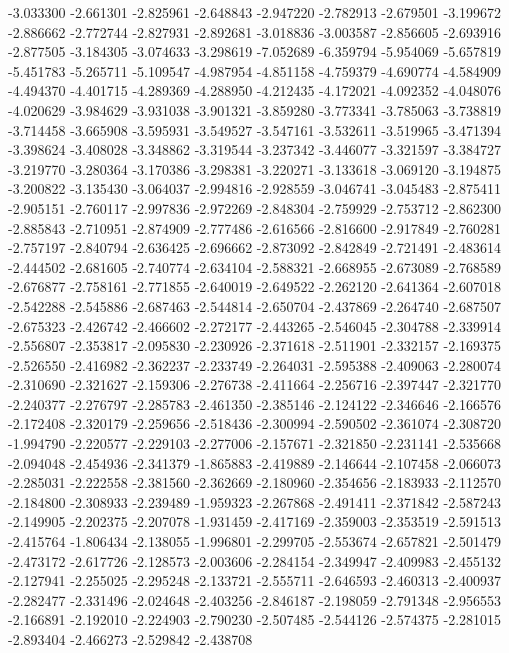 -3.033300
-2.661301
-2.825961
-2.648843
-2.947220
-2.782913
-2.679501
-3.199672
-2.886662
-2.772744
-2.827931
-2.892681
-3.018836
-3.003587
-2.856605
-2.693916
-2.877505
-3.184305
-3.074633
-3.298619
-7.052689
-6.359794
-5.954069
-5.657819
-5.451783
-5.265711
-5.109547
-4.987954
-4.851158
-4.759379
-4.690774
-4.584909
-4.494370
-4.401715
-4.289369
-4.288950
-4.212435
-4.172021
-4.092352
-4.048076
-4.020629
-3.984629
-3.931038
-3.901321
-3.859280
-3.773341
-3.785063
-3.738819
-3.714458
-3.665908
-3.595931
-3.549527
-3.547161
-3.532611
-3.519965
-3.471394
-3.398624
-3.408028
-3.348862
-3.319544
-3.237342
-3.446077
-3.321597
-3.384727
-3.219770
-3.280364
-3.170386
-3.298381
-3.220271
-3.133618
-3.069120
-3.194875
-3.200822
-3.135430
-3.064037
-2.994816
-2.928559
-3.046741
-3.045483
-2.875411
-2.905151
-2.760117
-2.997836
-2.972269
-2.848304
-2.759929
-2.753712
-2.862300
-2.885843
-2.710951
-2.874909
-2.777486
-2.616566
-2.816600
-2.917849
-2.760281
-2.757197
-2.840794
-2.636425
-2.696662
-2.873092
-2.842849
-2.721491
-2.483614
-2.444502
-2.681605
-2.740774
-2.634104
-2.588321
-2.668955
-2.673089
-2.768589
-2.676877
-2.758161
-2.771855
-2.640019
-2.649522
-2.262120
-2.641364
-2.607018
-2.542288
-2.545886
-2.687463
-2.544814
-2.650704
-2.437869
-2.264740
-2.687507
-2.675323
-2.426742
-2.466602
-2.272177
-2.443265
-2.546045
-2.304788
-2.339914
-2.556807
-2.353817
-2.095830
-2.230926
-2.371618
-2.511901
-2.332157
-2.169375
-2.526550
-2.416982
-2.362237
-2.233749
-2.264031
-2.595388
-2.409063
-2.280074
-2.310690
-2.321627
-2.159306
-2.276738
-2.411664
-2.256716
-2.397447
-2.321770
-2.240377
-2.276797
-2.285783
-2.461350
-2.385146
-2.124122
-2.346646
-2.166576
-2.172408
-2.320179
-2.259656
-2.518436
-2.300994
-2.590502
-2.361074
-2.308720
-1.994790
-2.220577
-2.229103
-2.277006
-2.157671
-2.321850
-2.231141
-2.535668
-2.094048
-2.454936
-2.341379
-1.865883
-2.419889
-2.146644
-2.107458
-2.066073
-2.285031
-2.222558
-2.381560
-2.362669
-2.180960
-2.354656
-2.183933
-2.112570
-2.184800
-2.308933
-2.239489
-1.959323
-2.267868
-2.491411
-2.371842
-2.587243
-2.149905
-2.202375
-2.207078
-1.931459
-2.417169
-2.359003
-2.353519
-2.591513
-2.415764
-1.806434
-2.138055
-1.996801
-2.299705
-2.553674
-2.657821
-2.501479
-2.473172
-2.617726
-2.128573
-2.003606
-2.284154
-2.349947
-2.409983
-2.455132
-2.127941
-2.255025
-2.295248
-2.133721
-2.555711
-2.646593
-2.460313
-2.400937
-2.282477
-2.331496
-2.024648
-2.403256
-2.846187
-2.198059
-2.791348
-2.956553
-2.166891
-2.192010
-2.224903
-2.790230
-2.507485
-2.544126
-2.574375
-2.281015
-2.893404
-2.466273
-2.529842
-2.438708
